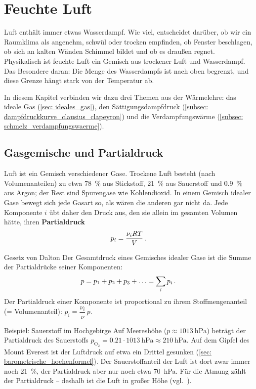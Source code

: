 \chapter{Feuchte Luft}\label{chap: feuchte_luft}
Luft enthält immer etwas Wasserdampf. Wie viel, entscheidet darüber, ob wir ein Raumklima als angenehm, schwül oder trocken empfinden, ob Fenster beschlagen, ob sich an kalten Wänden Schimmel bildet und ob es draußen regnet. Physikalisch ist feuchte Luft ein Gemisch aus trockener Luft und Wasserdampf. Das Besondere daran: Die Menge des Wasserdampfs ist nach oben begrenzt, und diese Grenze hängt stark von der Temperatur ab.

In diesem Kapitel verbinden wir dazu drei Themen aus der Wärmelehre: das ideale Gas (\cref{sec: ideales_gas}), den Sättigungsdampfdruck (\cref{subsec: dampfdruckkurve_clausius_clapeyron}) und die Verdampfungswärme (\cref{subsec: schmelz_verdampfungswaerme}).

\section{Gasgemische und Partialdruck}\label{sec: partialdruck}
Luft ist ein Gemisch verschiedener Gase. Trockene Luft besteht (nach Volumenanteilen) zu etwa \SI{78}{\percent} aus Stickstoff, \SI{21}{\percent} aus Sauerstoff und \SI{0.9}{\percent} aus Argon; der Rest sind Spurengase wie Kohlendioxid. In einem Gemisch idealer Gase bewegt sich jede Gasart so, als wären die anderen gar nicht da. Jede Komponente $i$ übt daher den Druck aus, den sie allein im gesamten Volumen hätte, ihren \textbf{Partialdruck}
\begin{equation}\label{eq: partialdruck}
    p_i = \frac{\nu_i R T}{V} \,.
\end{equation}

\begin{rememberbox}{Gesetz von Dalton}
    Der Gesamtdruck eines Gemisches idealer Gase ist die Summe der Partialdrücke seiner Komponenten:
    \begin{equation}\label{eq: dalton}
        p = p_1 + p_2 + p_3 + \ldots = \sum_i p_i \,.
    \end{equation}
    Der Partialdruck einer Komponente ist proportional zu ihrem Stoffmengenanteil (= Volumenanteil): $p_i = \dfrac{\nu_i}{\nu} \, p$.
\end{rememberbox}

\begin{examplebox}[]{Beispiel: Sauerstoff im Hochgebirge}
    Auf Meereshöhe ($p \approx \SI{1013}{\hecto\pascal}$) beträgt der Partialdruck des Sauerstoffs $p_{\text{O}_2} = \num{0.21} \cdot \SI{1013}{\hecto\pascal} \approx \SI{210}{\hecto\pascal}$. Auf dem Gipfel des Mount Everest ist der Luftdruck auf etwa ein Drittel gesunken (\cref{sec: barometrische_hoehenformel}). Der Sauerstoffanteil der Luft ist dort zwar immer noch \SI{21}{\percent}, der Partialdruck aber nur noch etwa \SI{70}{\hecto\pascal}. Für die Atmung zählt der Partialdruck -- deshalb ist die Luft in großer Höhe  (vgl.~\cite[S.~638]{Giancoli2010}).
\end{examplebox}

